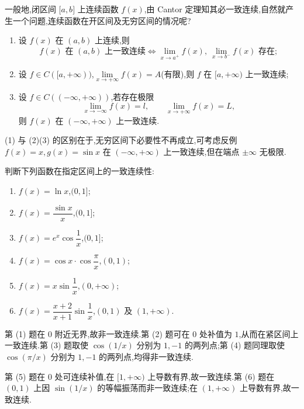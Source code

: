 一般地,闭区间 $\lbrack a,b\rbrack$ 上连续函数 $f(x)$,由 Cantor 定理知其必一致连续,自然就产生一个问题,连续函数在开区间及无穷区间的情况呢?

\begin{theorem}[\markstar]
    \begin{enumerate}
        \item 设 $f(x)$ 在 $(a,b)$ 上连续,则
              \[
                  f(x)\text{ 在 }(a,b)\text{ 上一致连续}
                  \Longleftrightarrow
                  \lim\limits_{x\to a^+}f(x),\ \lim\limits_{x\to b^-}f(x)\text{ 存在};
              \]
        \item 设 $f\in C(\lbrack a,+\infty))$,$\displaystyle\lim\limits_{x\to+\infty}f(x)=A$(有限),则 $f$ 在 $\lbrack a,+\infty)$ 上一致连续;
        \item 设 $f\in C(( -\infty,+\infty))$,若存在极限
              \[
                  \lim\limits_{x\to-\infty}f(x)=l,
                  \qquad
                  \lim\limits_{x\to+\infty}f(x)=L,
              \]
              则 $f(x)$ 在 $(-\infty,+\infty)$ 上一致连续.
    \end{enumerate}
\end{theorem}

\begin{remark}
    (1) 与 (2)(3) 的区别在于,无穷区间下必要性不再成立,可考虑反例 $f(x)=x,g(x)=\sin x$ 在 $(-\infty,+\infty)$ 上一致连续,但在端点 $\pm\infty$ 无极限.
\end{remark}

\begin{example}
    判断下列函数在指定区间上的一致连续性:
    \begin{enumerate}
        \item $f(x)=\ln x$,$(0,1\rbrack$;
        \item $f(x)=\dfrac{\sin x}{x}$,$(0,1\rbrack$;
        \item $f(x)=e^x\cos\dfrac{1}{x}$,$(0,1\rbrack$;
        \item $f(x)=\cos x\cdot\cos\dfrac{\pi}{x}$,$(0,1)$;
        \item $f(x)=x\sin\dfrac{1}{x}$,$(0,+\infty)$;
        \item $f(x)=\dfrac{x+2}{x+1}\sin\dfrac{1}{x}$,$(0,1)$ 及 $(1,+\infty)$.
    \end{enumerate}
\end{example}
\exampleblank

\begin{solution}
    第 (1) 题在 $0$ 附近无界,故非一致连续.第 (2) 题可在 $0$ 处补值为 $1$,从而在紧区间上一致连续.第 (3) 题取使 $\cos(1/x)$ 分别为 $1,-1$ 的两列点;第 (4) 题同理取使 $\cos(\pi/x)$ 分别为 $1,-1$ 的两列点,均得非一致连续.

    第 (5) 题在 $0$ 处可连续补值,在 $\lbrack1,+\infty)$ 上导数有界,故一致连续.第 (6) 题在 $(0,1)$ 上因 $\sin(1/x)$ 的等幅振荡而非一致连续;在 $(1,+\infty)$ 上导数有界,故一致连续.
\end{solution}

